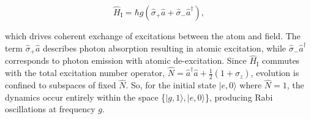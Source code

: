 \documentclass[11pt]{article}
\begin{document}
\begin{equation*}
     \hat{H}_{\scriptscriptstyle \text{I}} = \hbar g(\hat{\sigma}_{+}\hat{a} +\hat{\sigma}_{-}\hat{a}^\dagger),
\end{equation*}

which drives coherent exchange of excitations between the atom and field. The term $\hat{\sigma}_{+}\hat{a}$ describes photon absorption resulting in atomic excitation, while $\hat{\sigma}_{-}\hat{a}^\dagger$ corresponds to photon emission with atomic de-excitation. Since $\hat{H}_{\scriptscriptstyle\text{I}}$ commutes with the total excitation number operator, $\hat{N} = \hat{a}^\dagger \hat{a} + \frac{1}{2}(1 + \hat{\sigma}_z)$, evolution is confined to subspaces of fixed $\hat{N}$. So, for the initial state $|e,0\rangle$ where $\hat{N} = 1$, the dynamics occur entirely within the space \{$|g,1\rangle,|e,0\rangle$\}, producing Rabi oscillations at frequency $g$.
\end{document}
